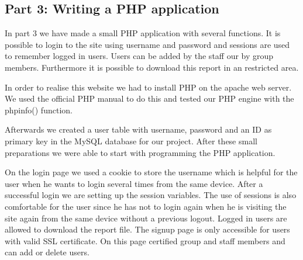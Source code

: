 \subsection {Part 3: Writing a PHP application}


\noindent
In part 3 we have made a small PHP application with several functions. It is possible to login to the site using username and password and sessions are used to remember logged in users. Users can be added by the staff our by group members. Furthermore it is possible to download this report in an restricted area. \newline

\noindent
In order to realise this website we had to install PHP on the apache web server. We used the official PHP manual to do this \cite{phpinstall}  and tested our PHP engine with the phpinfo() function.\newline

\noindent
Afterwards we created a user table with username, password and an ID as primary key  in the MySQL database for our project. After these small preparations we were able to start with programming the PHP application.  \newline

\noindent
On the login page we used a cookie to store the username which is helpful for the user when he wants to login several times from the same device. After a successful login we are setting up the session variables. The use of sessions is also comfortable for the user since he has not to login again when he is visiting the site again from the same device without a previous logout. Logged in users  are allowed to download the report file. The signup page is only accessible for users with valid SSL certificate. On this page certified group and staff members and can add or delete users.
\newline
